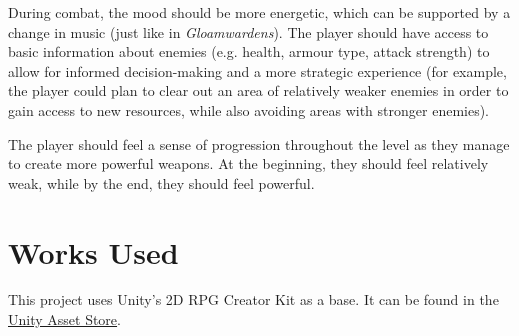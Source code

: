 \documentclass[10pt]{article}
\begin{document}
During combat, the mood should be more energetic, which can be supported by a change in music (just like in \textit{Gloamwardens}).
The player should have access to basic information about enemies (e.g. health, armour type, attack strength) to allow
for informed decision-making and a more strategic experience (for example, the player could plan to clear out an area
of relatively weaker enemies in order to gain access to new resources, while also avoiding areas with stronger enemies).

The player should feel a sense of progression throughout the level as they manage to create more powerful weapons.
At the beginning, they should feel relatively weak, while by the end, they should feel powerful.




\section{Works Used}

This project uses Unity's 2D RPG Creator Kit as a base. It can be found in the \href{https://assetstore.unity.com/packages/templates/tutorials/creator-kit-rpg-149309}{Unity Asset Store}.




\end{document}
